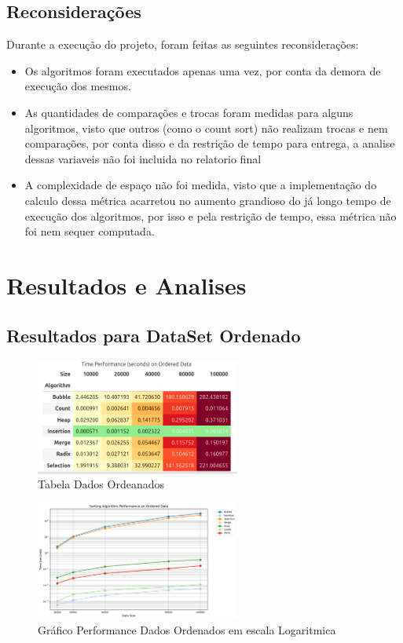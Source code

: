 \section{Reconsiderações}
Durante a execução do projeto, foram feitas as seguintes reconsiderações: 
\begin{itemize}
  \item Os algoritmos foram executados apenas uma vez, por conta da demora de execução dos mesmos. 
  \item As quantidades de comparações e trocas foram medidas para alguns algoritmos, visto que outros (como o count sort) não realizam trocas e nem comparações, por conta disso e da restrição de tempo para entrega, a analise dessas variaveis não foi incluida no relatorio final
  \item A complexidade de espaço não foi medida, visto que a implementação do calculo dessa métrica acarretou no aumento grandioso do já longo tempo de execução dos algoritmos, por isso e pela restrição de tempo, essa métrica não foi nem sequer computada.
\end{itemize}
\chapter{Resultados e Analises}
\section{Resultados para DataSet Ordenado}

\begin{figure}[H]
  \centering
  \includegraphics[width=0.6\textwidth]{images/order_table}
  \caption{Tabela Dados Ordeanados}
  \label{fig:Tabela Dados Ordenados}
\end{figure}

\begin{figure}[H]
  \centering
  \includegraphics[width=0.6\textwidth]{images/all_algo_order}
  \caption{Gráfico Performance Dados Ordenados em escala Logaritmica}
  \label{fig:Gráfico Performance Dados Ordenados}
\end{figure}

